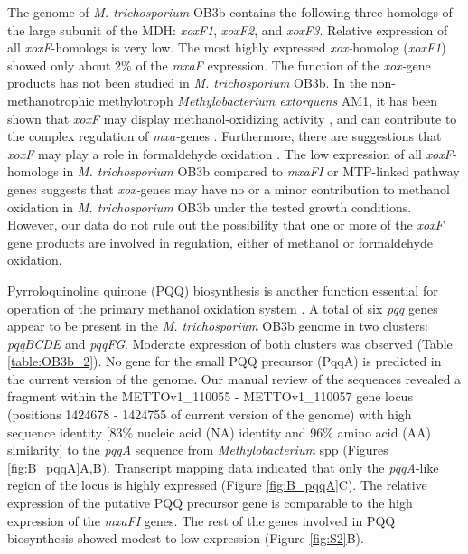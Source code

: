 The genome of \textit{M. trichosporium} OB3b contains the following three homologs of the large subunit of the MDH: \textit{xoxF1}, \textit{xoxF2}, and \textit{xoxF3}.
Relative expression of all \textit{xoxF}-homologs is very low.
The most highly expressed \textit{xox-}homolog (\textit{xoxF1}) showed only about 2\% of the \textit{mxaF} expression.
The function of the \textit{xox-}gene products has not been studied in \textit{M. trichosporium} OB3b.
In the non-methanotrophic methylotroph \textit{Methylobacterium extorquens} AM1, it has been shown that \textit{xoxF} may display methanol-oxidizing activity \cite{schmidt2010}, and can contribute to the complex regulation of \textit{mxa-}genes \cite{skovran2011}.
Furthermore, there are suggestions that \textit{xoxF} may play a role in formaldehyde oxidation \cite{wilson2008}.
The low expression of all \textit{xoxF}-homologs in \textit{M. trichosporium} OB3b compared to \textit{mxaFI} or MTP-linked pathway genes suggests that \textit{xox-}genes may have no or a minor contribution to methanol oxidation in \textit{M. trichosporium} OB3b under the tested growth conditions.
However, our data do not rule out the possibility that one or more of the \textit{xoxF} gene products are involved in regulation, either of methanol or formaldehyde oxidation.

Pyrroloquinoline quinone (PQQ) biosynthesis is another function essential for operation of the primary methanol oxidation system \cite{toyama1997, anthony2002}.
A total of six \textit{pqq} genes appear to be present in the \textit{M. trichosporium} OB3b genome in two clusters: \textit{pqqBCDE} and \textit{pqqFG}.
Moderate expression of both clusters was observed (Table \ref{table:OB3b_2}).
No gene for the small PQQ precursor (PqqA) is predicted in the current version of the genome.
Our manual review of the sequences revealed a fragment within the METTOv1\_110055 - METTOv1\_110057 gene locus (positions 1424678 - 1424755 of current version of the genome) with high sequence identity [83\% nucleic acid (NA) identity and 96\% amino acid (AA) similarity] to the \textit{pqqA} sequence from \textit{Methylobacterium} spp (Figures \ref{fig:B_pqqA}A,B).
Transcript mapping data indicated that only the \textit{pqqA}-like region of the locus is highly expressed (Figure \ref{fig:B_pqqA}C).
The relative expression of the putative PQQ precursor gene is comparable to the high expression of the \textit{mxaFI} genes.
The rest of the genes involved in PQQ biosynthesis showed modest to low expression (Figure \ref{fig:S2}B).

